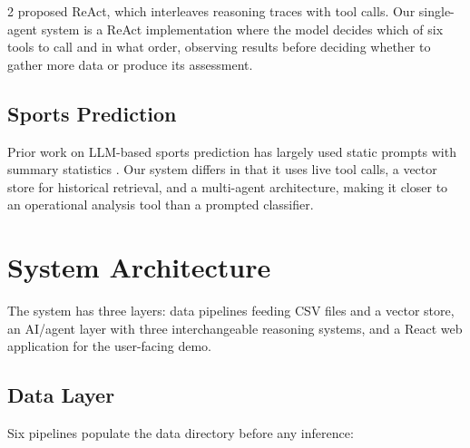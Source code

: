 \documentclass[11pt]{article}
\begin{document}
\begin{multicols}{2}
\citet{yao2023} proposed ReAct, which interleaves reasoning traces with tool calls. Our single-agent system is a ReAct implementation where the model decides which of six tools to call and in what order, observing results before deciding whether to gather more data or produce its assessment.

\subsection{Sports Prediction}

Prior work on LLM-based sports prediction has largely used static prompts with summary statistics \citep{kadavath2022}. Our system differs in that it uses live tool calls, a vector store for historical retrieval, and a multi-agent architecture, making it closer to an operational analysis tool than a prompted classifier.

\section{System Architecture}

The system has three layers: data pipelines feeding CSV files and a vector store, an AI/agent layer with three interchangeable reasoning systems, and a React web application for the user-facing demo.

\subsection{Data Layer}

Six pipelines populate the data directory before any inference:


\end{multicols}
\end{document}
